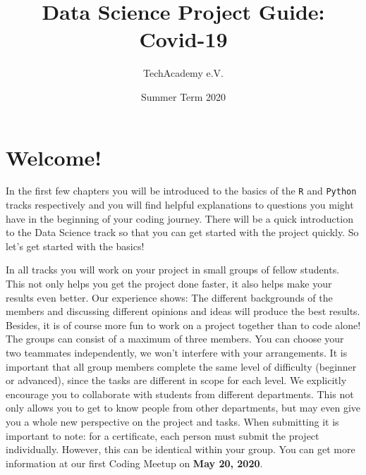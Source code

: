 \documentclass[
  11pt,
]{article}
\title{Data Science Project Guide: Covid-19}
\author{TechAcademy e.V.}
\date{Summer Term 2020}
\begin{document}
\maketitle

\clearpage

\addtolength{\headheight}{17.82275pt}

\fancyfoot{}
\fancyfoot[R]{\thepage}
\addtolength{\headheight}{17.82275pt}


\renewcommand{\headrulewidth}{0.25pt}
\renewcommand{\footrulewidth}{0.25pt}

\tableofcontents
\clearpage

\hypertarget{welcome}{%
\section{Welcome!}\label{welcome}}

In the first few chapters you will be introduced to the basics of the \texttt{R} and \texttt{Python} tracks respectively and you will find helpful explanations to questions you might have in the beginning of your coding journey. There will be a quick introduction to the Data Science track so that you can get started with the project quickly. So let's get started with the basics!

In all tracks you will work on your project in small groups of fellow students. This not only helps you get the project done faster, it also helps make your results even better. Our experience shows: The different backgrounds of the members and discussing different opinions and ideas will produce the best results. Besides, it is of course more fun to work on a project together than to code alone!\\
The groups can consist of a maximum of three members. You can choose your two teammates independently, we won't interfere with your arrangements. It is important that all group members complete the same level of difficulty (beginner or advanced), since the tasks are different in scope for each level. We explicitly encourage you to collaborate with students from different departments. This not only allows you to get to know people from other departments, but may even give you a whole new perspective on the project and tasks.
When submitting it is important to note: for a certificate, each person must submit the project individually. However, this can be identical within your group. You can get more information at our first Coding Meetup on \textbf{May 20, 2020}.
\end{document}
